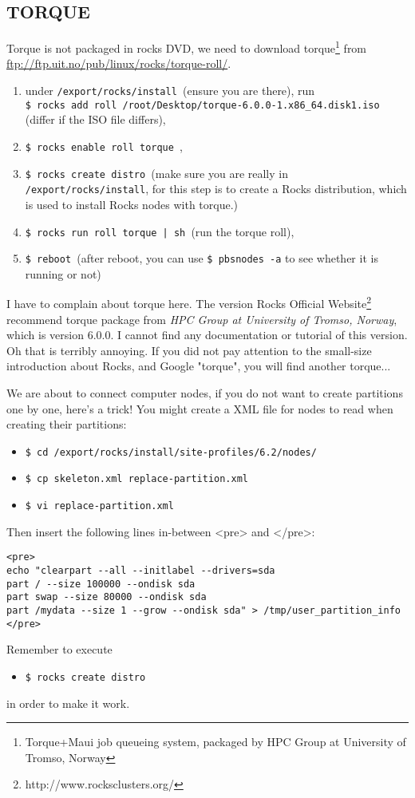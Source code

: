 \subsection{TORQUE}
Torque is not packaged in rocks DVD, we need to download torque\footnote{Torque+Maui job queueing system, packaged by HPC Group at University of Tromso, Norway} from \url{ftp://ftp.uit.no/pub/linux/rocks/torque-roll/}.
\begin{enumerate}
\item under {\tt /export/rocks/install }(ensure you are there), run \\ {\tt \$ rocks add roll /root/Desktop/torque-6.0.0-1.x86\_64.disk1.iso } (differ if the ISO file differs),
\item {\tt \$ rocks enable roll torque },
\item {\tt \$ rocks create distro }(make sure you are really in {\tt /export/rocks/install}, for this step is to create a Rocks distribution, which is used to install Rocks nodes with torque.)
\item {\tt \$ rocks run roll torque | sh }(run the torque roll),
\item {\tt \$ reboot }(after reboot, you can use {\tt \$ pbsnodes -a} to see whether it is running or not)
\end{enumerate}
\begin{remark}
I have to complain about torque here. The version Rocks Official Website\footnote{http://www.rocksclusters.org/} recommend torque package from {\it HPC Group at University of Tromso, Norway}, which is version 6.0.0. I cannot find any documentation or tutorial of this version. Oh that is terribly annoying. If you did not pay attention to the small-size introduction about Rocks, and Google "torque", you will find another torque...
\end{remark}

We are about to connect computer nodes, if you do not want to create partitions one by one, here's a trick! You might create a XML file for nodes to read when creating their partitions:
\begin{itemize}
\item {\tt \$ cd /export/rocks/install/site-profiles/6.2/nodes/}
\item {\tt \$ cp skeleton.xml replace-partition.xml}
\item {\tt \$ vi replace-partition.xml}
\end{itemize}
Then insert the following lines in-between <pre> and </pre>:
\begin{lstlisting}[basicstyle=\ttfamily\scriptsize,columns=fullflexible]
<pre>
echo "clearpart --all --initlabel --drivers=sda
part / --size 100000 --ondisk sda
part swap --size 80000 --ondisk sda
part /mydata --size 1 --grow --ondisk sda" > /tmp/user_partition_info
</pre>
\end{lstlisting}
Remember to execute 
\begin{itemize}
\item {\tt \$ rocks create distro}
\end{itemize}
in order to make it work.

